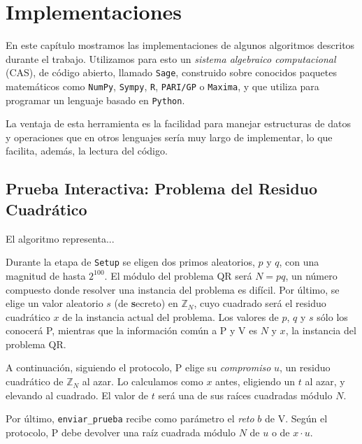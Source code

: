 \chapter{Implementaciones}\label{ch:implementaciones} 

En este capítulo mostramos las implementaciones de algunos algoritmos descritos durante el trabajo. Utilizamos para esto un \textit{sistema algebraico computacional} (CAS), de código abierto, llamado \texttt{Sage}, construido sobre conocidos paquetes matemáticos como \texttt{NumPy}, \texttt{Sympy}, \texttt{R}, \texttt{PARI/GP} o \texttt{Maxima}, y que utiliza para programar un lenguaje basado en \texttt{Python}.

La ventaja de esta herramienta es la facilidad para manejar estructuras de datos y operaciones que en otros lenguajes sería muy largo de implementar, lo que facilita, además, la lectura del código.


\section{Prueba Interactiva: Problema del Residuo Cuadrático}





El algoritmo representa...

Durante la etapa de \texttt{Setup} se eligen dos primos aleatorios, $p$ y $q$, con una magnitud de hasta $2^{100}$. El módulo del problema QR será $N=pq$, un número compuesto donde resolver una instancia del problema es difícil. Por último, se elige un valor aleatorio $s$ (de \textbf{s}ecreto) en $\mathbb{Z}_N$, cuyo cuadrado será el residuo cuadrático $x$ de la instancia actual del problema. Los valores de $p$, $q$ y $s$ sólo los conocerá P, mientras que la información común a P y V es $N$ y $x$, la instancia del problema QR.

A continuación, siguiendo el protocolo, P elige su \textit{compromiso} $u$, un residuo cuadrático de $\mathbb{Z}_N$ al azar. Lo calculamos como $x$ antes, eligiendo un $t$ al azar, y elevando al cuadrado. El valor de $t$ será una de sus raíces cuadradas módulo $N$.

Por último, \texttt{enviar\_prueba} recibe como parámetro el \textit{reto} $b$ de V. Según el protocolo, P debe devolver una raíz cuadrada módulo $N$ de $u$ o de $x\cdot u$.

